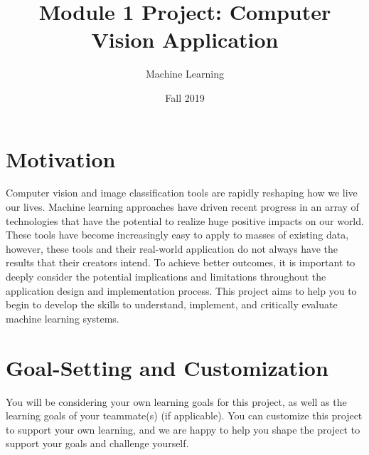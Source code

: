 \documentclass{tufte-handout}
\title{Module 1 Project: Computer Vision Application}
\author{Machine Learning}
\date{Fall 2019}
\begin{document}
\maketitle
\thispagestyle{firstpage}

%

\section*{Motivation}

Computer vision and image classification tools are rapidly reshaping how we live our lives. Machine learning approaches have driven recent progress in an array of technologies that have the potential to realize huge positive impacts on our world. These tools have become increasingly easy to apply to masses of existing data, however, these tools and their real-world application do not always have the results that their creators intend. To achieve better outcomes, it is important to deeply consider the potential implications and limitations throughout the application design and implementation process. This project aims to help you to begin to develop the skills to understand, implement, and critically evaluate machine learning systems. 

\section*{Goal-Setting and Customization}

You will be considering your own learning goals for this project, as well as the learning goals of your teammate(s) (if applicable). You can customize this project to support your own learning, and we are happy to help you shape the project to support your goals and challenge yourself. 
\end{document}
